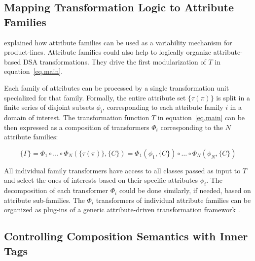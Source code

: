 \subsection{Mapping Transformation Logic to Attribute Families}
\label{sec.tango.domain}

 explained how attribute families can be used as a variability mechanism for product-lines. Attribute families could also help to logically organize attribute-based DSA transformations. They drive the first modularization of $T$ in equation~\ref{eq.main}.

Each family of attributes can be processed by a single transformation unit specialized for that family. Formally, the entire attribute set $\{\tau(\pi)\}$ is split in a finite series of disjoint subsets $\phi_i$, corresponding to each attribute family $i$ in a domain of interest. The transformation function $T$ in equation~\ref{eq.main} can be then expressed as a composition of transformers $\Phi_i$ corresponding to the $N$ attribute families:

\begin{equation}
\{\Gamma\} = \Phi_1 \circ \dots \circ \Phi_N(\{\tau(\pi)\}, \{C\}) 
= \Phi_1(\phi_1, \{C\}) \circ \dots \circ \Phi_N(\phi_N, \{C\})
\label{eq.compose}
\end{equation}

All individual family transformers have access to all classes passed as input to $T$ and select the ones of interests based on their specific attributes $\phi_i$. The decomposition of each transformer $\Phi_i$ could be done similarly, if needed, based on attribute sub-families. The $\Phi_i$ transformers of individual attribute families can be organized as plug-ins of a generic attribute-driven transformation framework .

\subsection{Controlling Composition Semantics with Inner Tags}
\label{sec.inner.tags}

